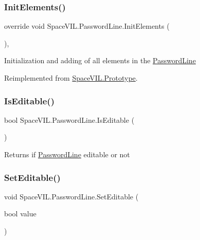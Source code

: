 \subsubsection{\texorpdfstring{Init\+Elements()}{InitElements()}}
{\footnotesize\ttfamily override void Space\+V\+I\+L.\+Password\+Line.\+Init\+Elements (\begin{DoxyParamCaption}{ }\end{DoxyParamCaption})\hspace{0.3cm}{\ttfamily [inline]}, {\ttfamily [virtual]}}



Initialization and adding of all elements in the \mbox{\hyperlink{class_space_v_i_l_1_1_password_line}{Password\+Line}} 



Reimplemented from \mbox{\hyperlink{class_space_v_i_l_1_1_prototype_ac3379fe02923ee155b5b0084abf27420}{Space\+V\+I\+L.\+Prototype}}.

\mbox{\label{class_space_v_i_l_1_1_password_line_a1defdc8c76e67ca62653ce1c06277e88}} 
\subsubsection{\texorpdfstring{Is\+Editable()}{IsEditable()}}
{\footnotesize\ttfamily bool Space\+V\+I\+L.\+Password\+Line.\+Is\+Editable (\begin{DoxyParamCaption}{ }\end{DoxyParamCaption})\hspace{0.3cm}{\ttfamily [inline]}}



Returns if \mbox{\hyperlink{class_space_v_i_l_1_1_password_line}{Password\+Line}} editable or not 

\mbox{\label{class_space_v_i_l_1_1_password_line_a51ffda354019718ff1118b55d8c6470e}} 
\subsubsection{\texorpdfstring{Set\+Editable()}{SetEditable()}}
{\footnotesize\ttfamily void Space\+V\+I\+L.\+Password\+Line.\+Set\+Editable (\begin{DoxyParamCaption}\item[{bool}]{value }\end{DoxyParamCaption})\hspace{0.3cm}{\ttfamily [inline]}}



